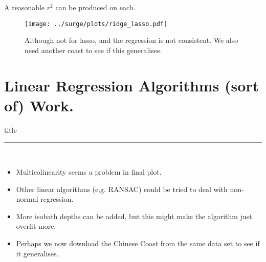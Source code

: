 \begin{frame}{A reasonable $r^2$ can be produced on each.}
\vspace{-15pt}
\hspace{-30pt}
 \begin{minipage}{1.0\textwidth}
\begin{figure}[htb!]
    \centering
    \texttt{[image: ../surge/plots/ridge\_lasso.pdf]}
    \vspace{-15pt}
   \caption{Although not for lasso, and the regression is not consistent.
            We also need another coast to see if this generalises.}
    \label{fig:A}
\end{figure}
\end{minipage}
\end{frame}


\section{Linear Regression Algorithms (sort of) Work. }
\begin{frame}[plain]
        \vfill
      \centering
      \begin{beamercolorbox}[sep=8pt,center,shadow=true,rounded=true]{title}
        \insertsectionhead\par%
        \color{oxfordblue}\noindent\rule{10cm}{1pt} \\
        \begin{itemize}
        \item Multicolinearity seems a problem in final plot.
        \item Other linear algorithms (e.g. RANSAC) could be tried
              to deal with non-normal regression.
        \item More isobath depths can be added, but this might make
              the algorithm just overfit more.
        \item Perhaps we now download the Chinese Coast from the same
              data set to see if it generalises.
        \end{itemize}
      \end{beamercolorbox}
      \vfill
\end{frame}
